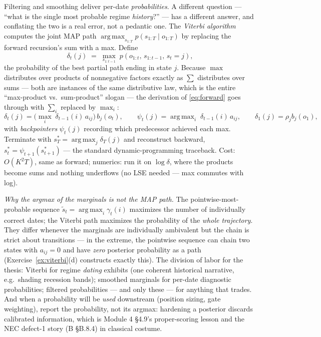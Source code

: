 \documentclass[11pt]{article}
\numberwithin{equation}{section}
\theoremstyle{plain}
\theoremstyle{definition}
\theoremstyle{remark}
\DeclareMathOperator*{\argmax}{arg\,max}
\newcommand{\resp}{\gamma}
\begin{document}
Filtering and smoothing deliver per-date \emph{probabilities}. A different question --- ``what is the single most probable regime \emph{history}?'' --- has a different answer, and conflating the two is a real error, not a pedantic one. The \emph{Viterbi algorithm} computes the joint MAP path $\argmax_{s_{1:T}} p(s_{1:T} \mid o_{1:T})$ by replacing the forward recursion's sum with a max. Define
\begin{equation}
\delta_t(j) \;=\; \max_{s_{1:t-1}}\; p(o_{1:t},\, s_{1:t-1},\, s_t = j),
\label{eq:deltadef}
\end{equation}
the probability of the best partial path ending in state $j$. Because $\max$ distributes over products of nonnegative factors exactly as $\sum$ distributes over sums --- both are instances of the same distributive law, which is the entire ``max-product vs.\ sum-product'' slogan --- the derivation of \eqref{eq:forward} goes through with $\sum_i$ replaced by $\max_i$:
\begin{equation}
\delta_t(j) = \Big( \max_i\; \delta_{t-1}(i)\, a_{ij} \Big)\, b_j(o_t),
\qquad
\psi_t(j) = \argmax_i\; \delta_{t-1}(i)\, a_{ij},
\qquad
\delta_1(j) = \rho_j b_j(o_1),
\label{eq:viterbi}
\end{equation}
with \emph{backpointers} $\psi_t(j)$ recording which predecessor achieved each max. Terminate with $s_T^\ast = \argmax_j \delta_T(j)$ and reconstruct backward, $s_{t}^\ast = \psi_{t+1}(s_{t+1}^\ast)$ --- the standard dynamic-programming traceback. Cost: $O(K^2 T)$, same as forward; numerics: run it on $\log \delta$, where the products become sums and nothing underflows (no LSE needed --- max commutes with log).

\emph{Why the argmax of the marginals is not the MAP path.} The pointwise-most-probable sequence $\tilde s_t = \argmax_i \resp_t(i)$ maximizes the number of individually correct dates; the Viterbi path maximizes the probability of the \emph{whole trajectory}. They differ whenever the marginals are individually ambivalent but the chain is strict about transitions --- in the extreme, the pointwise sequence can chain two states with $a_{ij} = 0$ and have \emph{zero} posterior probability as a path (Exercise~\ref{ex:viterbi}(d) constructs exactly this). The division of labor for the thesis: Viterbi for regime \emph{dating} exhibits (one coherent historical narrative, e.g.\ shading recession bands); smoothed marginals for per-date diagnostic probabilities; filtered probabilities --- and only these --- for anything that trades. And when a probability will be \emph{used} downstream (position sizing, gate weighting), report the probability, not its argmax: hardening a posterior discards calibrated information, which is Module 4 \S4.9's proper-scoring lesson and the NEC defect-1 story (B \S B.8.4) in classical costume.
\end{document}
